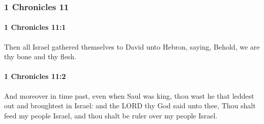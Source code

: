 	\subsubsection{1 Chronicles 11} %
		\label{1CHRONICLES-11}

		\paragraph{1 Chronicles 11:1} %
			\label{1CHRONICLES-11-1}

			Then all Israel gathered themselves to David unto Hebron, saying, Behold, we are thy bone and thy flesh.


		\paragraph{1 Chronicles 11:2} %
			\label{1CHRONICLES-11-2}

			And moreover in time past, even when Saul was king, thou wast he that leddest out and broughtest in Israel: and the LORD thy God said unto thee, Thou shalt feed my people Israel, and thou shalt be ruler over my people Israel.

